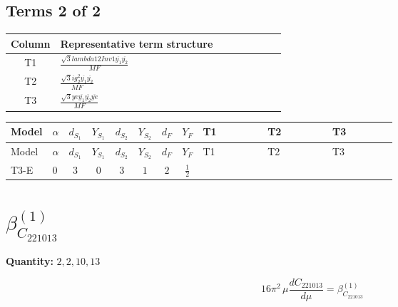 \documentclass[8pt]{article}
\begin{document}
\begin{landscape}
\subsection*{Terms 2 of 2}
\begin{center}
\begin{tabular}{@{}c >{\raggedright\arraybackslash}p{0.82\linewidth}@{}}
\toprule
Column & Representative term structure \\
\midrule
T1 & \(\displaystyle \frac{\sqrt{3} lambda12Inv1 \overline{y_{1}} \overline{y_{2}}}{MF}\) \\
\midrule
T2 & \(\displaystyle \frac{\sqrt{3} i g_{2}^{2} \overline{y_{1}} \overline{y_{2}}}{MF}\) \\
\midrule
T3 & \(\displaystyle \frac{\sqrt{3} ye \overline{y_{1}} \overline{y_{2}} \overline{ye}}{MF}\) \\
\midrule
\bottomrule
\end{tabular}
\end{center}
\smallskip
\tiny
\begin{longtable}{@{}llcccccc >{\raggedright\arraybackslash}p{0.21\linewidth} >{\raggedright\arraybackslash}p{0.21\linewidth} >{\raggedright\arraybackslash}p{0.21\linewidth}@{}}
\toprule
Model & $\alpha$ & $d_{S_1}$ & $Y_{S_1}$ & $d_{S_2}$ & $Y_{S_2}$ & $d_F$ & $Y_F$ & T1 & T2 & T3 \\
\midrule
\endfirsthead
\toprule
Model & $\alpha$ & $d_{S_1}$ & $Y_{S_1}$ & $d_{S_2}$ & $Y_{S_2}$ & $d_F$ & $Y_F$ & T1 & T2 & T3 \\
\midrule
\endhead
T3-E & $0$ & $3$ & $0$ & $3$ & $1$ & $2$ & $\frac{1}{2}$ & \scriptsize\adjustbox{max width=\linewidth}{$\begin{gathered} \frac{\sqrt{3} lambda12Inv1 \overline{y_{1}} \overline{y_{2}}}{6 MF}\end{gathered}$} & \scriptsize\adjustbox{max width=\linewidth}{$\begin{gathered} - \frac{\sqrt{3} i g_{2}^{2} \overline{y_{1}} \overline{y_{2}}}{6 MF}\end{gathered}$} & \scriptsize\adjustbox{max width=\linewidth}{$\begin{gathered} \frac{\sqrt{3} ye \overline{y_{1}} \overline{y_{2}} \overline{ye}}{12 MF}\end{gathered}$} \\
\midrule
\bottomrule
\end{longtable}
\clearpage
\section*{$\beta_{C_{221013}}^{(1)}$}
\noindent\textbf{Quantity: }$\mathrm{2,2,10,13}$\par\smallskip
\[16\pi^2\,\mu\frac{d C_{221013}}{d\mu}=\beta_{C_{221013}}^{(1)}\]

\end{landscape}
\end{document}
